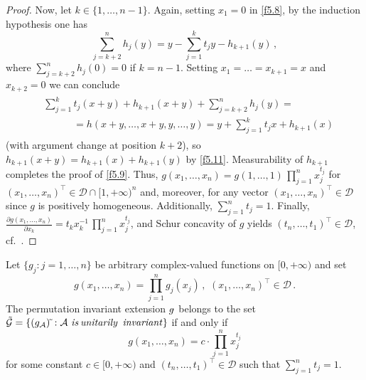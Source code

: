 \documentclass{amsart}
\begin{document}
\begin{proof}
Now, let $k \in \{1,\ldots,n-1\}$. Again, setting $x_1=0$ in \eqref{f5.8}, by the induction hypothesis one has
\begin{equation}   \label{f5.11}
     \sum_{j=k+2}^n h_j(y) = y - \sum_{j=1}^k t_j y -h_{k+1}(y) \, ,
\end{equation}
where $\sum_{j=k+2}^n h_j(0) =0$    if $k=n-1$. Setting $x_1=\ldots=x_{k+1}=x$ and $x_{k+2}=0$ we can conclude
\begin{eqnarray*}
\begin{split}
   & \sum_{j=1}^k t_j(x+y) +h_{k+1}(x+y) + \sum_{j=k+2}^n h_j(y) = \\
    &\quad \quad \quad = h(x+y,\ldots,x+y,y,\ldots,y) = y + \sum_{j=1}^k t_jx + h_{k+1}(x)
\end{split}
\end{eqnarray*}
(with argument change at position $k+2$), so $h_{k+1}(x+y) = h_{k+1}(x) + h_{k+1}(y)$ by \eqref{f5.11}. Measurability of $h_{k+1}$ completes the proof of \eqref{f5.9}.  Thus, $g(x_1,\ldots,x_n) = g(1,\ldots,1) \, \prod_{j=1}^n x_j^{t_j}$ for $(x_1,\ldots,x_n)^\top \in {\mathcal D} \cap [1,+\infty)^n$ and, moreover, for any vector $(x_1,\ldots,x_n)^\top \in \mathcal D$ since $g$ is positively homogeneous. Additionally, $\sum_{j=1}^n t_j = 1$. Finally,  $\frac{{\partial} g(x_1,\ldots,x_n)}{{\partial} x_k} = t_kx_k^{-1} \, \prod_{j=1}^n x_j^{t_j}$, and Schur concavity of $g$ yields $(t_n,\ldots,t_1)^\top \in \mathcal D$, cf.~\cite[Thm.~3.A.3]{MOA}. 
\end{proof}

\begin{pro} \label{p5.6}
   Let $\{ g_j : j = 1,\ldots,n \}$ be arbitrary complex-valued functions on $[0,+\infty)$ and set
   \begin{equation} \label{f5.12}
        g(x_1,\ldots,x_n) = \prod_{j=1}^n g_j(x_j) \, , \,\, (x_1,\ldots,x_n)^\top \in {\mathcal D} \, .
   \end{equation}
   The permutation invariant extension $g\tilde{\,}$ belongs to the set $\tilde{{\mathcal G}} = \{ ({g}_{{\mathcal A}})\tilde{\,} : {\mathcal A} \,\, {\it is} \, {\it unitarily}$ ${\it invariant} \}$ if and only if 
   \begin{equation} \label{f5.13}
        g(x_1,\ldots,x_n) = c \cdot \prod_{j=1}^n x_j^{t_j}     
   \end{equation}     
   for some constant $c \in [0,+\infty)$ and $(t_n,\ldots,t_1)^\top \in \mathcal D$ such that $\sum_{j=1}^n t_j=1$.
\end{pro}
\end{document}
